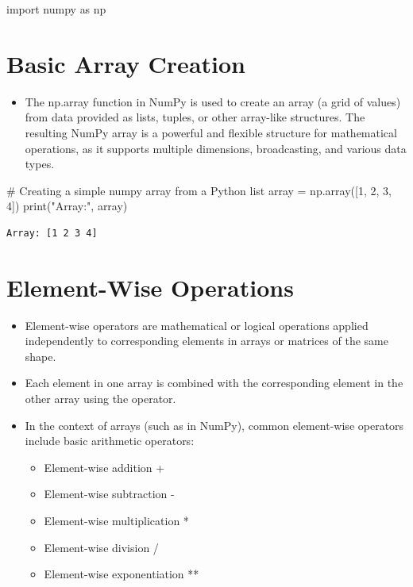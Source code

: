 \documentclass[
  letterpaper,
  DIV=11,
  numbers=noendperiod]{scrreprt}
\newenvironment{Shaded}{\begin{snugshade}}{\end{snugshade}}
\newcommand{\BuiltInTok}[1]{\textcolor[rgb]{0.00,0.23,0.31}{#1}}
\newcommand{\CommentTok}[1]{\textcolor[rgb]{0.37,0.37,0.37}{#1}}
\newcommand{\DecValTok}[1]{\textcolor[rgb]{0.68,0.00,0.00}{#1}}
\newcommand{\ImportTok}[1]{\textcolor[rgb]{0.00,0.46,0.62}{#1}}
\newcommand{\NormalTok}[1]{\textcolor[rgb]{0.00,0.23,0.31}{#1}}
\newcommand{\OperatorTok}[1]{\textcolor[rgb]{0.37,0.37,0.37}{#1}}
\newcommand{\StringTok}[1]{\textcolor[rgb]{0.13,0.47,0.30}{#1}}
\providecommand{\tightlist}{%
  \setlength{\itemsep}{0pt}\setlength{\parskip}{0pt}}\usepackage{longtable,booktabs,array}
\begin{document}
\begin{Shaded}
\begin{Highlighting}[]
\ImportTok{import}\NormalTok{ numpy }\ImportTok{as}\NormalTok{ np}
\end{Highlighting}
\end{Shaded}

\section{Basic Array Creation}\label{basic-array-creation}

\begin{itemize}
\tightlist
\item
  The np.array function in NumPy is used to create an array (a grid of
  values) from data provided as lists, tuples, or other array-like
  structures. The resulting NumPy array is a powerful and flexible
  structure for mathematical operations, as it supports multiple
  dimensions, broadcasting, and various data types.
\end{itemize}

\begin{Shaded}
\begin{Highlighting}[]
\CommentTok{\# Creating a simple numpy array from a Python list}
\NormalTok{array }\OperatorTok{=}\NormalTok{ np.array([}\DecValTok{1}\NormalTok{, }\DecValTok{2}\NormalTok{, }\DecValTok{3}\NormalTok{, }\DecValTok{4}\NormalTok{])}
\BuiltInTok{print}\NormalTok{(}\StringTok{"Array:"}\NormalTok{, array)}
\end{Highlighting}
\end{Shaded}

\begin{verbatim}
Array: [1 2 3 4]
\end{verbatim}

\section{Element-Wise Operations}\label{element-wise-operations}

\begin{itemize}
\tightlist
\item
  Element-wise operators are mathematical or logical operations applied
  independently to corresponding elements in arrays or matrices of the
  same shape.
\item
  Each element in one array is combined with the corresponding element
  in the other array using the operator.
\item
  In the context of arrays (such as in NumPy), common element-wise
  operators include basic arithmetic operators:

  \begin{itemize}
  \tightlist
  \item
    Element-wise addition +
  \item
    Element-wise subtraction -
  \item
    Element-wise multiplication *
  \item
    Element-wise division /
  \item
    Element-wise exponentiation **
  \end{itemize}
\end{itemize}
\end{document}
